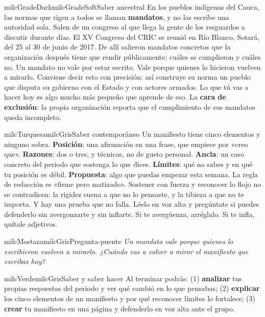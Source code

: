 \documentclass[11pt,letterpaper]{article}
\begin{document}
\begin{softbox}{milcGradeDark}{milcGradeSoft}{Saber ancestral}
En los pueblos indígenas del Cauca, las normas que rigen a todos se llaman \textbf{mandatos}, y no las escribe una autoridad sola. Salen de un congreso al que llega la gente de los resguardos a discutir durante días. El XV Congreso del CRIC se reunió en Río Blanco, Sotará, del 25 al 30 de junio de 2017. De allí salieron mandatos concretos que la organización después tiene que rendir públicamente: cuáles se cumplieron y cuáles no. Un mandato no vale por estar escrito. Vale porque quienes lo hicieron vuelven a mirarlo. Conviene decir esto con precisión: así construye su norma un pueblo que disputa su gobierno con el Estado y con actores armados. Lo que tú vas a hacer hoy es algo mucho más pequeño que aprende de eso. La \textbf{cara de exclusión}: la propia organización reporta que el cumplimiento de sus mandatos queda incompleto.\par{}
\end{softbox}

\begin{softbox}{milcTurquesa}{milcGris}{Saber contemporáneo}
Un manifiesto tiene cinco elementos y ninguno sobra. \textbf{Posición}: una afirmación en una frase, que empiece por «creo que». \textbf{Razones}: dos o tres, y técnicas, no de gusto personal. \textbf{Ancla}: un caso concreto del periodo que sostenga lo que dices. \textbf{Límites}: qué no sabes y en qué tu posición es débil. \textbf{Propuesta}: algo que puedas empezar esta semana. La regla de redacción es «firme pero matizado». Sostener con fuerza y reconocer lo flojo no se contradicen: la rigidez suena a que no lo pensaste, y la tibieza a que no te importa. Y hay una prueba que no falla. Léelo en voz alta y pregúntate si puedes defenderlo sin avergonzarte y sin inflarte. Si te avergüenza, arréglalo. Si te infla, quítale adjetivos.
\end{softbox}

\begin{softbox}{milcMostaza}{milcGris}{Pregunta-puente}
\textit{Un mandato vale porque quienes lo escribieron vuelven a mirarlo. ¿Cuándo vas a volver a mirar el manifiesto que escribas hoy?}
\end{softbox}

\begin{softbox}{milcVerde}{milcGris}{Saber y saber hacer}
Al terminar podrás: (1) \textbf{analizar} tus propias respuestas del periodo y ver qué cambió en lo que pensabas; (2) \textbf{explicar} los cinco elementos de un manifiesto y por qué reconocer límites lo fortalece; (3) \textbf{crear} tu manifiesto en una página y defenderlo en voz alta ante el grupo.
\end{softbox}
\end{document}
